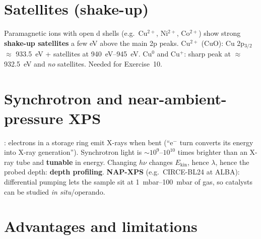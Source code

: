 \section{Satellites (shake-up)\extra}
Paramagnetic ions with open d shells (e.g.\ Cu$^{2+}$, Ni$^{2+}$, Co$^{2+}$) show strong \textbf{shake-up satellites}
a few eV above the main 2p peaks. Cu$^{2+}$ (CuO): Cu 2p$_{3/2}$ $\approx$ \SI{933.5}{eV} + satellites at
\SIrange{940}{945}{eV}. Cu$^0$ and Cu$^+$: sharp peak at $\approx$\SI{932.5}{eV} and \emph{no} satellites. Needed for
Exercise~10.

\section{Synchrotron and near-ambient-pressure XPS}
: electrons in a storage ring emit X-rays when bent (``e$^-$ turn converts its energy into X-ray
generation''). Synchrotron light is $\sim10^{9}$--$10^{10}$ times brighter than an X-ray tube and \textbf{tunable}
in energy. Changing $h\nu$ changes $E_\mathrm{kin}$, hence $\lambda$, hence the probed depth: \textbf{depth profiling}.
\textbf{NAP-XPS} (e.g.\ CIRCE-BL24 at ALBA): differential pumping lets the sample sit at \SIrange{1}{100}{mbar} of gas,
so catalysts can be studied \emph{in situ}/operando.

\section{Advantages and limitations}
